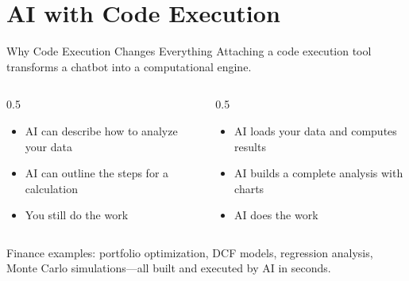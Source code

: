 \documentclass[aspectratio=169]{beamer}
\begin{document}
\section{AI with Code Execution}

\begin{frame}{Why Code Execution Changes Everything}
Attaching a code execution tool transforms a chatbot into a \alert{computational engine}.
\vspace{0.3cm}
\begin{columns}[T]
\begin{column}{0.5\textwidth}
\begin{shadedbox}[title=\textbf{Without Code Execution}]
\begin{itemize}\small
  \item AI can describe how to analyze your data
  \item AI can outline the steps for a calculation
  \item \alert{You still do the work}
\end{itemize}
\end{shadedbox}
\end{column}
\begin{column}{0.5\textwidth}
\begin{shadedbox}[title=\textbf{With Code Execution}]
\begin{itemize}\small
  \item AI loads your data and computes results
  \item AI builds a complete analysis with charts
  \item \alert{AI does the work}
\end{itemize}
\end{shadedbox}
\end{column}
\end{columns}

\vspace{0.3cm}
Finance examples: portfolio optimization, DCF models, regression analysis, Monte Carlo simulations---all built and executed by AI in seconds.
\end{frame}
\end{document}
